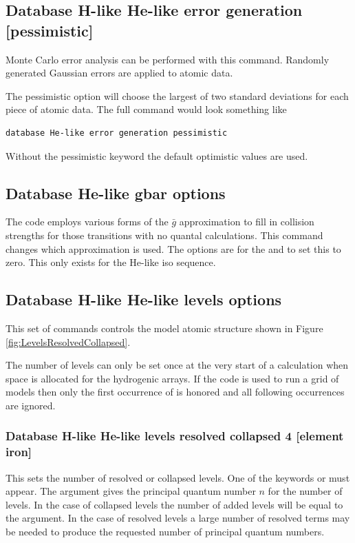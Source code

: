 \subsection{Database H-like \OR{} He-like error generation [pessimistic]}

Monte Carlo error analysis can be performed with this command.
Randomly
generated Gaussian errors are applied to atomic data.

The pessimistic option will choose the largest of two standard deviations
for each piece of atomic data.
The full command would look something like
\begin{verbatim}
database He-like error generation pessimistic
\end{verbatim}
Without the
pessimistic keyword the default optimistic values are used.

\subsection{Database He-like gbar options}

The code employs various forms of the $\bar g$
approximation to fill in collision strengths for those transitions with
no quantal calculations.
This command changes which approximation is used.
The options are  for the \citet{Vriens1980} and
 to set this to zero.
This only exists for the He-like iso sequence.

\subsection{Database H-like \OR{} He-like levels options}

This set of commands controls the model atomic structure shown in 
Figure \ref{fig:LevelsResolvedCollapsed}.

The number of levels can only be set once at the very start of a
calculation when space is allocated for the hydrogenic arrays.
If the code
is used to run a grid of models then only the first occurrence of
 is honored and all following occurrences
are ignored.

\subsubsection{Database H-like \OR{} He-like levels resolved \OR{} collapsed  4 [element iron]}

This sets the number of resolved or collapsed levels.
One of the keywords  or  must appear.
The argument gives the principal quantum
number $n$ for the number of levels.
In the case of collapsed levels the number of added levels will be equal to the argument.
In the case of resolved levels a large number of resolved terms may be needed
to produce the requested number of principal quantum numbers.

